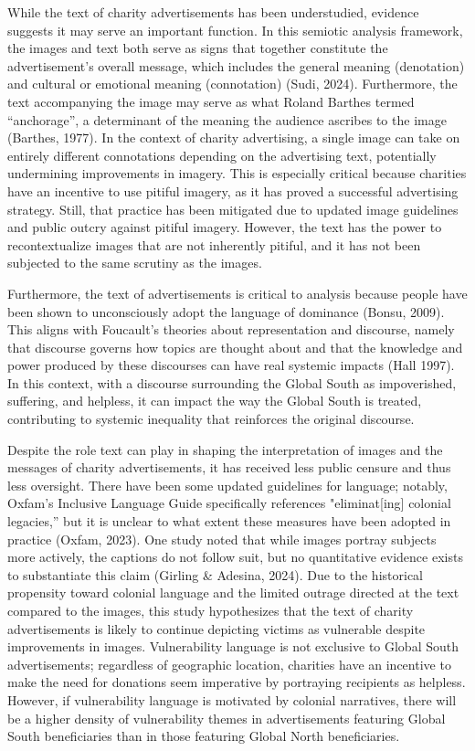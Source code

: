 While the text of charity advertisements has been understudied, evidence suggests it may serve an important function. In this semiotic analysis framework, the images and text both serve as signs that together constitute the advertisement's overall message, which includes the general meaning (denotation) and cultural or emotional meaning (connotation) (Sudi, 2024). Furthermore, the text accompanying the image may serve as what Roland Barthes termed “anchorage”, a determinant of the meaning the audience ascribes to the image (Barthes, 1977). In the context of charity advertising, a single image can take on entirely different connotations depending on the advertising text, potentially undermining improvements in imagery. This is especially critical because charities have an incentive to use pitiful imagery, as it has proved a successful advertising strategy. Still, that practice has been mitigated due to updated image guidelines and public outcry against pitiful imagery. However, the text has the power to recontextualize images that are not inherently pitiful, and it has not been subjected to the same scrutiny as the images.

Furthermore, the text of advertisements is critical to analysis because people have been shown to unconsciously adopt the language of dominance (Bonsu, 2009). This aligns with Foucault’s theories about representation and discourse, namely that discourse governs how topics are thought about and that the knowledge and power produced by these discourses can have real systemic impacts (Hall 1997). In this context, with a discourse surrounding the Global South as impoverished, suffering, and helpless, it can impact the way the Global South is treated, contributing to systemic inequality that reinforces the original discourse.

Despite the role text can play in shaping the interpretation of images and the messages of charity advertisements, it has received less public censure and thus less oversight. There have been some updated guidelines for language; notably, Oxfam’s Inclusive Language Guide specifically references "eliminat[ing] colonial legacies,” but it is unclear to what extent these measures have been adopted in practice (Oxfam, 2023). One study noted that while images portray subjects more actively, the captions do not follow suit, but no quantitative evidence exists to substantiate this claim (Girling \& Adesina, 2024). Due to the historical propensity toward colonial language and the limited outrage directed at the text compared to the images, this study hypothesizes that the text of charity advertisements is likely to continue depicting victims as vulnerable despite improvements in images. Vulnerability language is not exclusive to Global South advertisements; regardless of geographic location, charities have an incentive to make the need for donations seem imperative by portraying recipients as helpless. However, if vulnerability language is motivated by colonial narratives, there will be a higher density of vulnerability themes in advertisements featuring Global South beneficiaries than in those featuring Global North beneficiaries.

